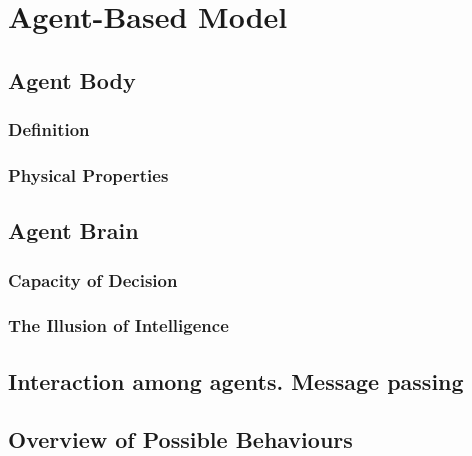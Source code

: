 \ifx\isEmbedded\undefined

\graphicspath{{../img/}}

\fi

\chapter{Agent-Based Model}
\label{chap:agent-based model}

\section{Agent Body}

\subsection{Definition}

\subsection{Physical Properties}

\section{Agent Brain}

\subsection{Capacity of Decision}

\subsection{The Illusion of Intelligence}

\section{Interaction among agents. Message passing}

\section{Overview of Possible Behaviours}


\ifx\isEmbedded\undefined


\pagebreak

\fi
